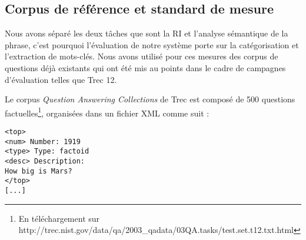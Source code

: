 \documentclass[10pt,a4paper]{article}
\begin{document}
\subsection{Corpus de référence et standard de mesure}

\par Nous avons séparé les deux tâches que sont la RI et l'analyse sémantique de la phrase, c'est pourquoi l'évaluation de notre système porte sur la catégorisation et l'extraction de mots-clés. Nous avons utilisé pour ces mesures des corpus de questions déjà existants qui ont été mis au points dans le cadre de campagnes d'évaluation telles que Trec 12. %
\par Le corpus \textit{Question Answering Collections} de Trec est composé de 500 questions factuelles\footnote{En téléchargement sur http://trec.nist.gov/data/qa/2003\_qadata/03QA.tasks/test.set.t12.txt.html}, organisées dans un fichier XML comme suit : 

\begin{verbatim}
<top>
<num> Number: 1919
<type> Type: factoid
<desc> Description:
How big is Mars?
</top>
[...]
\end{verbatim}
\end{document}
